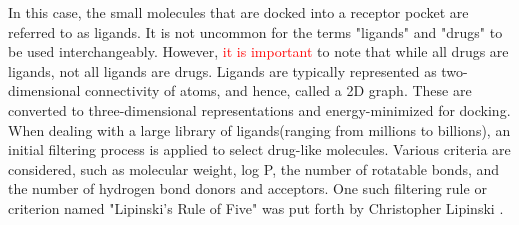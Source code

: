 \documentclass[10pt, a4paper]{book}
\begin{document}

In this case, the small molecules that are docked into a receptor pocket are referred to as ligands. It is not uncommon for the terms "ligands" and "drugs" to be used interchangeably. However, \textcolor{red}{it is important} to note that while all drugs are ligands, not all ligands are drugs. Ligands are typically represented as two-dimensional connectivity of atoms, and hence, called a 2D graph. These are converted to three-dimensional representations  and energy-minimized for docking.  When dealing with a large library of ligands\cite{bib10}(ranging from millions to billions), an initial filtering process is applied to select drug-like molecules. Various criteria are considered, such as molecular weight, log P, the number of rotatable bonds, and the number of hydrogen bond donors and acceptors. One such filtering  rule or criterion named "Lipinski's  Rule of Five" was put forth by Christopher Lipinski \cite{bib11}. {} 
\end{document}
